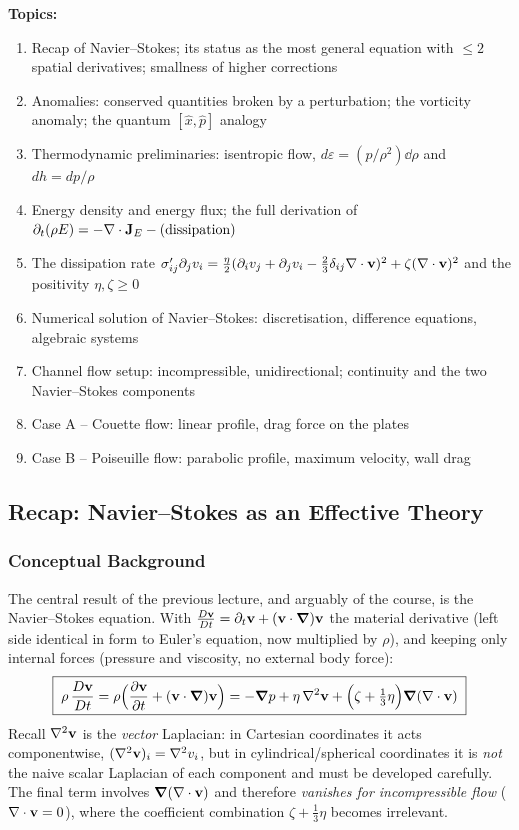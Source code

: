 \documentclass[../main.tex]{subfiles}
\begin{document}
\medskip\noindent\textbf{Topics:}
\begin{enumerate}
  \item Recap of Navier--Stokes; its status as the most general equation with $\le 2$ spatial derivatives; smallness of higher corrections
  \item Anomalies: conserved quantities broken by a perturbation; the vorticity anomaly; the quantum $[\hat x,\hat p]$ analogy
  \item Thermodynamic preliminaries: isentropic flow, $d\varepsilon=(p/\rho^2)\dd{\rho}$ and $dh=dp/\rho$
  \item Energy density and energy flux; the full derivation of $\partial_t(\rho E)=-\nabla \cdot\mathbf{J}_E-(\text{dissipation})$
  \item The dissipation rate $\sigma'_{ij}\partial_j v_i=\tfrac{\eta}{2}(\partial_iv_j+\partial_jv_i-\tfrac23\delta_{ij}\nabla \cdot\mathbf{v})^2+\zeta(\nabla \cdot\mathbf{v})^2$ and the positivity $\eta,\zeta\ge0$
  \item Numerical solution of Navier--Stokes: discretisation, difference equations, algebraic systems
  \item Channel flow setup: incompressible, unidirectional; continuity and the two Navier--Stokes components
  \item Case A -- Couette flow: linear profile, drag force on the plates
  \item Case B -- Poiseuille flow: parabolic profile, maximum velocity, wall drag
\end{enumerate}

\subsection{Recap: Navier--Stokes as an Effective Theory}\label{sec:lec19:recap}

\subsubsection*{Conceptual Background}
The central result of the previous lecture, and arguably of the course, is the Navier--Stokes equation. With $\frac{D\mathbf{v}}{Dt}=\partial_t\mathbf{v}+(\mathbf{v}\cdot\grad)\mathbf{v}$ the material derivative (left side identical in form to Euler's equation, now multiplied by $\rho$), and keeping only internal forces (pressure and viscosity, no external body force):
\begin{equation}
  \boxed{\;\rho\,\frac{D\mathbf{v}}{Dt}
    = \rho\Big(\pdv{\mathbf{v}}{t}+(\mathbf{v}\cdot\grad)\mathbf{v}\Big)
    = -\grad p + \eta\,\nabla^2\mathbf{v} + \Big(\zeta+\tfrac13\eta\Big)\grad(\nabla \cdot\mathbf{v})\;}
  \label{eq:lec19_NS}
\end{equation}
Recall $\nabla^2\mathbf{v}$ is the \emph{vector} Laplacian: in Cartesian coordinates it acts componentwise, $(\nabla^2\mathbf{v})_i=\nabla^2 v_i$, but in cylindrical/spherical coordinates it is \emph{not} the naive scalar Laplacian of each component and must be developed carefully. The final term involves $\grad(\nabla \cdot\mathbf{v})$ and therefore \emph{vanishes for incompressible flow} ($\nabla \cdot\mathbf{v}=0$), where the coefficient combination $\zeta+\tfrac13\eta$ becomes irrelevant.
\end{document}
